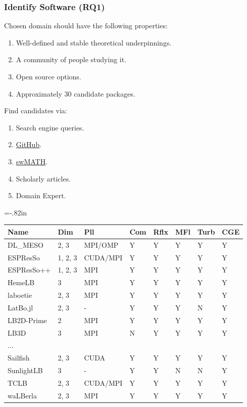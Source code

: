 \documentclass[usenames,dvipsnames]{beamer}
\begin{document}

\begin{frame}

  \frametitle{Identify Software (RQ1)}

  Chosen domain should have the following properties:

  \begin{enumerate}
  \item Well-defined and stable theoretical underpinnings.
  \item A community of people studying it.
  \item Open source options.
  \item Approximately 30 candidate packages.
  \end{enumerate}	
  
  Find candidates via:
  
  \begin{enumerate}
    \item Search engine queries.
    \item \href{https://github.com/} {GitHub}.
    \item \href{https://swmath.org/} {swMATH}.
    \item Scholarly articles.
    \item Domain Expert.
  \end{enumerate}

\end{frame}


\hoffset=-.82in %
\begin{frame}[plain]

  \begin{tabular}{ p{2.15cm}p{1.15cm}p{1.95cm}lllll}
    \toprule
    Name & Dim & Pll & Com & Rflx & MFl & Turb & CGE \\
    \midrule
    DL\_MESO & 2, 3 & MPI/OMP & Y & Y & Y & Y & Y \\
    ESPResSo & 1, 2, 3 & CUDA/MPI & Y & Y & Y & Y & Y \\
    ESPResSo++ & 1, 2, 3 & MPI & Y & Y & Y & Y & Y \\
    HemeLB & 3 & MPI & Y & Y & Y & Y & Y \\
    laboetie & 2, 3 & MPI & Y & Y & Y & Y & Y \\
    LatBo.jl & 2, 3 & - & Y & Y & Y & N & Y \\
    LB2D-Prime & 2 & MPI & Y & Y & Y & Y & Y \\
    LB3D & 3 & MPI & N & Y & Y & Y & Y \\
    ... &  &  &  &  &  &  & \\
    Sailfish & 2, 3 & CUDA & Y & Y & Y & Y & Y \\
    SunlightLB & 3 & - & Y & Y & N & N & Y \\
    TCLB & 2, 3 & CUDA/MPI & Y & Y & Y & Y & Y \\
    waLBerla & 2, 3 & MPI & Y & Y & Y & Y & Y \\
    \bottomrule
  \end{tabular}

\end{frame}
\hoffset=0in %
\end{document}
